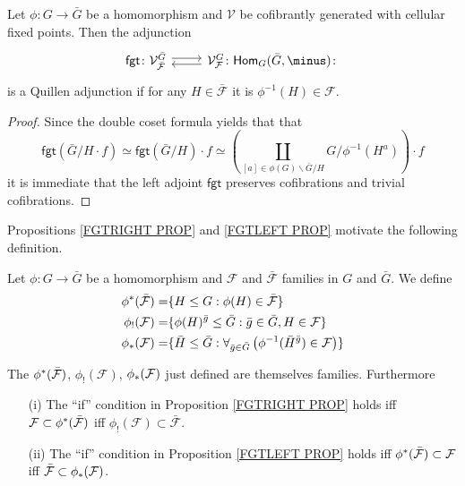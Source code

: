 \documentclass[a4paper,10pt]{article}%
\begin{document}
\begin{proposition}\label{FGTLEFT PROP}
	Let $\phi \colon G \to \bar{G}$ be a homomorphism and $\mathcal{V}$ be cofibrantly generated with cellular fixed points.		
	Then the adjunction
\begin{equation}
\begin{tikzcd}
	\mathsf{fgt}
	\colon
	\mathcal{V}^{\bar{G}}_{\mathcal{\bar{F}}} \ar[shift left=1]{r}
&
	\mathcal{V}^{G}_{\mathcal{F}}
	\colon
	\mathsf{Hom}_G(\bar{G},\minus)
	\colon \ar[shift left=1]{l}
\end{tikzcd}
\end{equation}
is a Quillen adjunction if for any 
$H \in \bar{\mathcal{F}}$ it is 
$\phi^{-1}(H) \in \mathcal{F}$.
\end{proposition}


\begin{proof}
	Since the double coset formula yields that that
\[
	\mathsf{fgt}\left(\bar{G}/H \cdot f\right)
		\simeq 
	\mathsf{fgt}\left(\bar{G}/H\right) \cdot f
		\simeq
	\left(
		\coprod_{[a] \in \phi(G)\backslash \bar{G} /H}
		{G/\phi^{-1}(H^{a})}
	\right)	\cdot f
\]
it is immediate that the left adjoint $\mathsf{fgt}$ preserves cofibrations and trivial cofibrations.
\end{proof}


Propositions \ref{FGTRIGHT PROP} and \ref{FGTLEFT PROP}
motivate the following definition.

\begin{definition}
	Let $\phi \colon G \to \bar{G}$ be a homomorphism and $\mathcal{F}$ and $\bar{\mathcal{F}}$ families in $G$
	and $\bar{G}$. We define
\begin{align}\label{PHISTARDEF EQ}
	\phi^{\**}(\bar{\mathcal{F}})
		=&
	\{H \leq G : \phi(H) \in \bar{\mathcal{F}}\}
\\
	\phi_!(\mathcal{F})
		=&
	\{\phi(H)^{\bar{g}}\leq \bar{G} : \bar{g} \in \bar{G}, H \in \mathcal{F}\}
\\ \label{PHISTARDEF3 EQ}
	\phi_{\**}(\mathcal{F})
		=&
	\{\bar{H} \leq \bar{G} : 
	\forall_{\bar{g} \in \bar{G}} 
	\left(
	\phi^{-1}(\bar{H}^{\bar{g}}) \in \mathcal{F}
	\right)\}
\end{align}
\end{definition}

\begin{lemma}
The $\phi^{\**}(\bar{\mathcal{F}})$, $\phi_{!}(\mathcal{F})$, $\phi_{\**}(\mathcal{F})$ just defined are 
themselves families. Furthermore
\begin{itemize}
\item[(i)] The ``if'' condition in Proposition \ref{FGTRIGHT PROP} holds iff 
$\mathcal{F} \subset \phi^{\**} (\bar{\mathcal{F}})$
iff
$\phi_{!}(\mathcal{F}) \subset \bar{\mathcal{F}}$.
\item [(ii)]
The ``if'' condition in Proposition \ref{FGTLEFT PROP} holds iff 
$\phi^{\**} (\bar{\mathcal{F}}) \subset \mathcal{F}$
iff
$\bar{\mathcal{F}} \subset \phi_{\**}(\mathcal{F})$.
\end{itemize}
\end{lemma}
\end{document}
